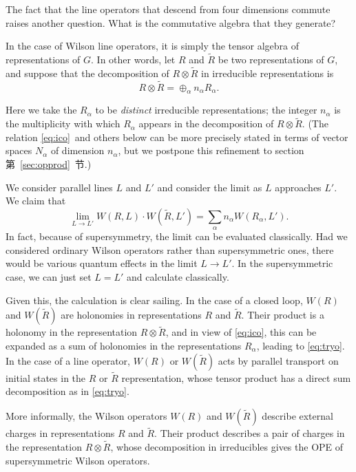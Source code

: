 \par{}

The fact that the line operators that descend from four dimensions
commute raises another question.  What is the commutative algebra
that they generate?

 In the case of Wilson line operators, it is simply the tensor
algebra of representations of $G$.  In other words, let $R$ and
$\tilde R$ be two representations of $G$, and suppose that the
decomposition of $R\otimes \tilde R$ in irreducible
representations is %
\setcounter{equation}{25}
\begin{equation}\label{eq:ico}
R\otimes \tilde R=\oplus_\alpha n_\alpha R_\alpha.
\end{equation}

Here we take the $R_\alpha$ to be {\it distinct} irreducible
representations; the integer $n_\alpha$ is the multiplicity with which
$R_\alpha$ appears in the decomposition of $R\otimes \tilde R$.  (The relation \eqref{eq:ico}\ and
others below can be more precisely stated in terms of vector spaces $N_\alpha$ of dimension $n_\alpha$,
but we postpone this refinement to section 第~\ref{sec:opprod}~节.)

We consider parallel lines $L$ and $L'$ and consider the limit as
$L$ approaches $L'$. We claim that %
\setcounter{equation}{26}
\begin{equation}\label{eq:tryo}
\lim_{L\to
L'}W(R,L)\cdot W(\tilde R,L')=\sum_\alpha n_\alpha W(R_\alpha,L').
\end{equation}
 In fact,
because of supersymmetry, the limit can be evaluated classically.
Had we considered ordinary Wilson operators rather than
supersymmetric ones, there would be various quantum effects in the
limit $L\to L'$.  In the supersymmetric case, we can just set
$L=L'$ and calculate classically.

Given this, the calculation is clear sailing. In the case of a
closed loop, $W(R)$ and $W({\tilde R})$ are holonomies in
representations $R$ and $\tilde R$. Their product is a holonomy in
the representation $R\otimes \tilde R$, and in view of \eqref{eq:ico}, this
can be expanded as a sum of holonomies in the representations
$R_\alpha$, leading to \eqref{eq:tryo}. In the case of a line operator, $W(R)$ or
$W(\tilde R)$ acts by parallel transport on initial states in the
$R$ or $\tilde R$ representation, whose tensor product has a
direct sum decomposition as in \eqref{eq:tryo}.

More informally, the Wilson operators $W(R)$ and $W(\tilde R)$
describe external charges in representations $R$ and $\tilde R$.
Their product describes a pair of charges in the representation
$R\otimes\tilde R$, whose decomposition in irreducibles gives the
OPE of supersymmetric Wilson operators.

